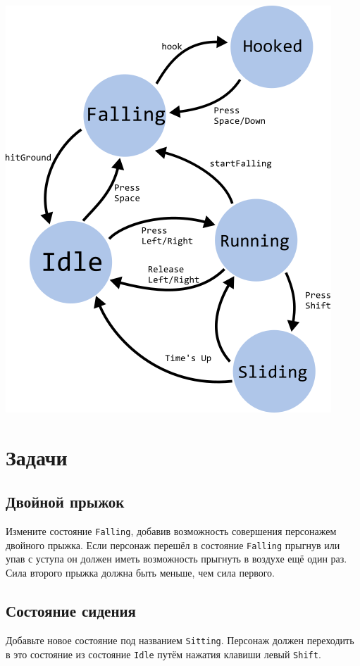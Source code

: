 \documentclass{article}
\begin{document}
\begin{itemize}
\begin{center}
\includegraphics[scale=0.8]{../images/hero_fsm.png}
\end{center}


\end{itemize}

\newpage
\section*{Задачи}

\subsection*{Двойной прыжок}
Измените состояние \texttt{Falling}, добавив возможность совершения персонажем двойного прыжка. Если персонаж перешёл в состояние \texttt{Falling} прыгнув или упав с уступа он должен иметь возможность прыгнуть в воздухе ещё один раз. Сила второго прыжка должна быть меньше, чем сила первого.


\subsection*{Состояние сидения}
Добавьте новое состояние под названием \texttt{Sitting}. Персонаж должен переходить в это состояние из состояние \texttt{Idle} путём нажатия клавиши левый \texttt{Shift}.
\end{document}
